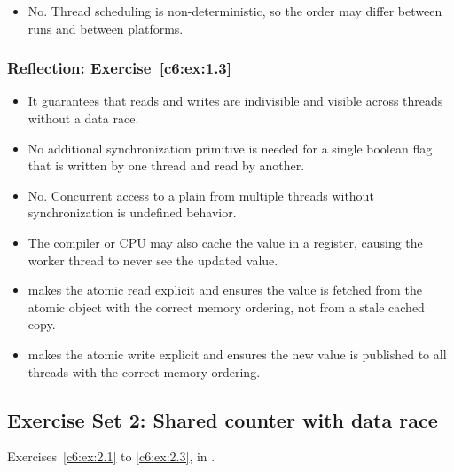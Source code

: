 \begin{itemize}
  \item No. Thread scheduling is non-deterministic, so the order may differ between runs and
    between platforms.
\end{itemize}

\subsubsection{Reflection: Exercise~\ref{c6:ex:1.3}}
\begin{itemize}
  \item It guarantees that reads and writes are indivisible and visible across threads without a
    data race.
  \item No additional synchronization primitive is needed for a single boolean flag that is written
    by one thread and read by another.
\end{itemize}

\begin{itemize}
  \item No. Concurrent access to a plain  from multiple threads without synchronization
    is undefined behavior.
  \item The compiler or CPU may also cache the value in a register, causing the worker thread to
    never see the updated value.
\end{itemize}

\begin{itemize}
  \item {} makes the atomic read explicit and ensures the value is fetched from the
    atomic object with the correct memory ordering, not from a stale cached copy.
\end{itemize}

\begin{itemize}
  \item {} makes the atomic write explicit and ensures the new value is published to all
    threads with the correct memory ordering.
\end{itemize}

\subsection{Exercise Set 2: Shared counter with data race}
\label{sol:set:c6.2}
Exercises~\ref{c6:ex:2.1} to \ref{c6:ex:2.3}, in .

